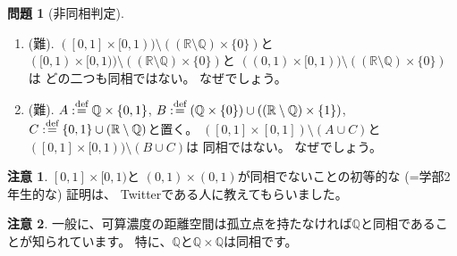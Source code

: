 \documentclass[uplatex]{jsarticle}
\theoremstyle{definition}
\newtheorem{prob}[prob]{問題}
\newtheorem*{rem*}{注意}
\newcommand{\dfn}{:\overset{\mbox{{\scriptsize def}}}{=}}
\newcommand{\R}{\mathbb{R}}
\newcommand{\Q}{\mathbb{Q}}
\begin{document}
\begin{prob}[非同相判定]
\begin{enumerate}
    \(([0,1]\times [0,1])\setminus ((\R\setminus \Q)\times \{0\})\)
    は同相ではない。
    なぜでしょう。
    \item (難).
    \(([0,1]\times [0,1))\setminus ((\R\setminus \Q)\times \{0\})\)と
    \(([0,1)\times [0,1))\setminus ((\R\setminus \Q)\times \{0\})\)と
    \(((0,1)\times [0,1))\setminus ((\R\setminus \Q)\times \{0\})\)は
    どの二つも同相ではない。
    なぜでしょう。
    \item (難).
    \(A\dfn \Q\times \{0,1\}\),
    \(B\dfn (\Q\times \{0\}) \cup ((\R\setminus \Q) \times \{1\})\),
    \(C\dfn \{0,1\} \cup (\R\setminus \Q)\)と置く。
    \(([0,1]\times [0,1])\setminus (A\cup C)\)と
    \(([0,1]\times [0,1))\setminus (B\cup C)\)は
    同相ではない。
    なぜでしょう。
  \end{enumerate}
\end{prob}

\begin{rem*}
  \([0,1]\times [0,1)\)と
  \((0,1)\times (0,1)\)が同相でないことの初等的な (=学部2年生的な) 証明は、
  Twitterである人に教えてもらいました。
\end{rem*}


\begin{rem*}
  一般に、可算濃度の距離空間は孤立点を持たなければ\(\Q\)と同相であることが知られています。
  特に、\(\Q\)と\(\Q\times \Q\)は同相です。
\end{rem*}
\end{document}

